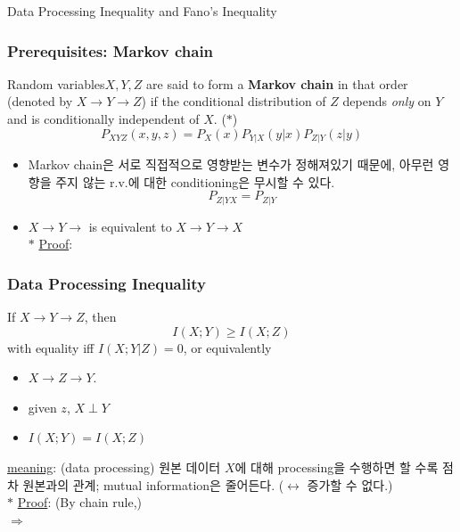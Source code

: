 \documentclass[9pt]{beamer}
\begin{document}
    \begin{section}{Data Processing Inequality and Fano's Inequality}
        \begin{frame}
            \frametitle{Prerequisites: Markov chain}
            \begin{definition}
                Random variables$ X, Y, Z$ are said to form a \textbf{Markov chain} in that order (denoted by $X \rightarrow Y \rightarrow Z$) if the conditional distribution of $Z$ depends \textit{only} on $Y$ and is conditionally independent of $X$. ($\ast$)
                $$P_{XYZ}(x, y, z) = P_X(x) P_{Y|X}(y|x) P_{Z|Y}(z|y)$$
            \end{definition}
            \begin{itemize}
                \item Markov chain은 서로 직접적으로 영향받는 변수가 정해져있기 때문에, 아무런 영향을 주지 않는 r.v.에 대한 conditioning은 무시할 수 있다.
                $$P_{Z|YX} = P_{Z|Y}$$
                \item $X \rightarrow Y \rightarrow$ is equivalent to $X \rightarrow Y \rightarrow X$
                \vspace{0.2cm}
                \\ $\ast$ \underline{Proof}: 
                \vspace{1.5cm}
            \end{itemize}
        
        \end{frame}

        \begin{frame}
            \frametitle{Data Processing Inequality}
            \begin{theorem}
                If $X \rightarrow Y \rightarrow Z$, then 
                $$ I(X;Y) \ge I(X;Z)$$
                with equality iff $I(X;Y|Z) = 0$, or equivalently 
                \begin{itemize}
                    \item $X \rightarrow Z \rightarrow Y$.
                    \item given $z$, $X \perp Y$
                    \item $I(X;Y) = I(X;Z)$
                \end{itemize}
            \end{theorem}
            \checkmark \underline{meaning}: (data processing) 원본 데이터 $X$에 대해 processing을 수행하면 할 수록 점차 원본과의 관계; mutual information은 줄어든다. ($\leftrightarrow$ 증가할 수 없다.)
            \vspace{0.2cm}
            \\ $\ast$ \underline{Proof}: 
            (By chain rule,)
            \\$\Rightarrow$
            \vspace{2.5cm}
        \end{frame}


\end{section}
\end{document}
